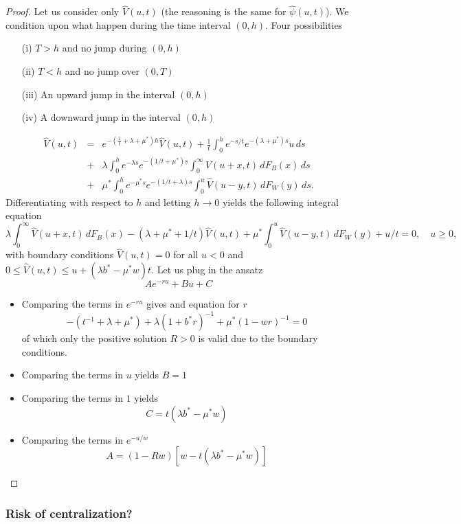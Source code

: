\begin{proof}
Let us consider only $\widehat{V}(u,t)$ (the reasoning is the same for $\widehat{\psi}(u,t)$).
We condition upon what happen during the time interval $(0,h)$. Four possibilities
\begin{itemize}
  \item[(i)] $T>h$ and no jump during $(0,h)$
  \item[(ii)] $T<h$ and no jump over $(0,T)$
  \item[(iii)] An upward jump in the interval $(0,h)$
  \item[(iv)] A downward jump in the interval $(0,h)$
\end{itemize}
  \begin{eqnarray*}\label{neu0}
      \widehat{V}(u,t)&=& e^{-(\frac{1}{t}+\lambda+\mu^\ast)h}\widehat{V}(u,t) + \frac{1}{t}\int_0^h e^{-{s}/{t}}e^{-(\lambda +\mu^\ast) s} u\,ds\\
      & +& \lambda\int_0^he^{-\lambda s} e^{-({1}/{t}+\mu^\ast) s} \int_0^\infty\widehat{V}(u+x,t)\,dF_{B}(x)\,ds\\
      &  +&\mu^\ast \int_0^he^{-\mu^\ast s} e^{-({1}/{t}+\lambda) s}\int_0^u \widehat{V}(u-y,t) \,dF_W(y)\,ds.
  \end{eqnarray*}
  Differentiating with respect to $h$ and letting $h\rightarrow 0$ yields the following integral equation
  \begin{equation} \label{inteq}
    \lambda\int_0^\infty\widehat{V}(u+x,t)\,dF_{B}(x)-(\lambda+\mu^\ast+{1}/{t})\widehat{V}(u,t)+\mu^\ast\int_0^u \widehat{V}(u-y,t) \,dF_W(y)+{u}/{t}=0,\quad u\ge 0,
  \end{equation}
  with boundary conditions $\widehat{V}(u,t)=0$ for all $u<0$ and $0\leq\widehat{V}(u,t)\leq u+(\lambda b^\ast - \mu^\ast w)t$. Let us plug in the ansatz
  $$
  Ae^{-ru}+Bu+C
  $$
  \begin{itemize}
    \item Comparing the terms in $e^{-r u}$ gives and equation for $r$
    $$
    -(t^{-1}+\lambda+\mu^\ast)+\lambda(1+b^\ast r)^{-1}+\mu^\ast(1-wr)^{-1}=0
    $$
    of which only the positive solution $R>0$ is valid due to the boundary conditions.
    \item Comparing the terms in $u$ yields $B = 1$
    \item Comparing the terms in $1$ yields
    $$
    C = t(\lambda b^\ast-\mu^\ast w)
    $$
    \item Comparing the terms in $e^{-u/w}$
    $$
    A = (1 - Rw)[w-t(\lambda b^\ast-\mu^\ast w)]
    $$
\end{itemize}
\end{proof}

\begin{ex}\label{ex:rp_pool_manager}
\end{ex}
\subsubsection{Risk of centralization?}\label{ssec:numerical_illustrations}

\newpage